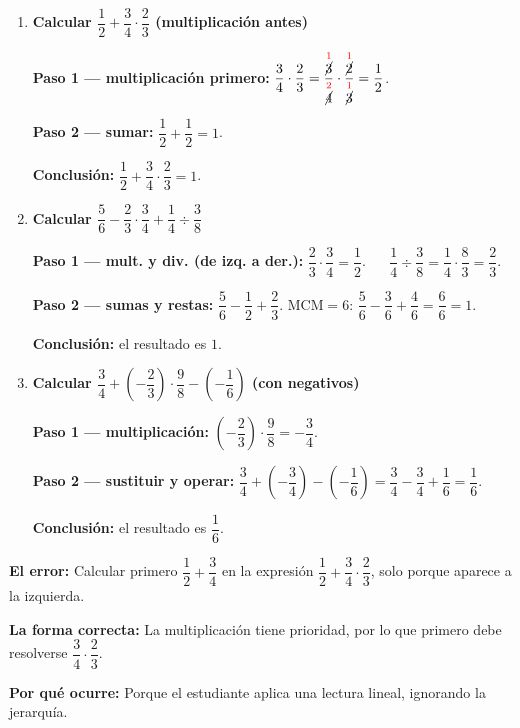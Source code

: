 \documentclass[11pt, letterpaper]{article}
\begin{document}
\begin{tcolorbox}[examplebox, title={Ejemplos sin s\'imbolos de agrupaci\'on}]
\begin{enumerate}[label=\textbf{Ej. \arabic*.}, leftmargin=*, itemsep=16pt]

\item \textbf{Calcular $\dfrac{1}{2}+\dfrac{3}{4}\cdot\dfrac{2}{3}$ (multiplicaci\'on antes)}

\textbf{Paso 1 --- multiplicaci\'on primero:}
$\dfrac{3}{4}\cdot\dfrac{2}{3}=\dfrac{\overset{\textcolor{red}{1}}{\cancel{3}}}{\overset{\textcolor{red}{2}}{\cancel{4}}}\cdot\dfrac{\overset{\textcolor{red}{1}}{\cancel{2}}}{\overset{\textcolor{red}{1}}{\cancel{3}}}=\dfrac{1}{2}$.

\medskip
\textbf{Paso 2 --- sumar:}
$\dfrac{1}{2}+\dfrac{1}{2}=1$.

\medskip
\textbf{Conclusi\'on:} $\dfrac{1}{2}+\dfrac{3}{4}\cdot\dfrac{2}{3}=1$.

\item \textbf{Calcular $\dfrac{5}{6}-\dfrac{2}{3}\cdot\dfrac{3}{4}+\dfrac{1}{4}\div\dfrac{3}{8}$}

\textbf{Paso 1 --- mult. y div. (de izq. a der.):}
$\dfrac{2}{3}\cdot\dfrac{3}{4}=\dfrac{1}{2}$. $\quad$ $\dfrac{1}{4}\div\dfrac{3}{8}=\dfrac{1}{4}\cdot\dfrac{8}{3}=\dfrac{2}{3}$.

\medskip
\textbf{Paso 2 --- sumas y restas:}
$\dfrac{5}{6}-\dfrac{1}{2}+\dfrac{2}{3}$. MCM$=6$: $\dfrac{5}{6}-\dfrac{3}{6}+\dfrac{4}{6}=\dfrac{6}{6}=1$.

\medskip
\textbf{Conclusi\'on:} el resultado es $1$.

\item \textbf{Calcular $\dfrac{3}{4}+\left(-\dfrac{2}{3}\right)\cdot\dfrac{9}{8}-\left(-\dfrac{1}{6}\right)$ (con negativos)}

\textbf{Paso 1 --- multiplicaci\'on:}
$\left(-\dfrac{2}{3}\right)\cdot\dfrac{9}{8}=-\dfrac{3}{4}$.

\medskip
\textbf{Paso 2 --- sustituir y operar:}
$\dfrac{3}{4}+\left(-\dfrac{3}{4}\right)-\left(-\dfrac{1}{6}\right)=\dfrac{3}{4}-\dfrac{3}{4}+\dfrac{1}{6}=\dfrac{1}{6}$.

\medskip
\textbf{Conclusi\'on:} el resultado es $\dfrac{1}{6}$.

\end{enumerate}
\end{tcolorbox}

\begin{tcolorbox}[warningbox, title={Error frecuente --- Resolver siempre de izquierda a derecha}]
\noindent\textbf{El error:}
Calcular primero $\dfrac{1}{2}+\dfrac{3}{4}$ en la expresi\'on $\dfrac{1}{2}+\dfrac{3}{4}\cdot\dfrac{2}{3}$, solo porque aparece a la izquierda.

\medskip
\noindent\textbf{La forma correcta:}
La multiplicaci\'on tiene prioridad, por lo que primero debe resolverse $\dfrac{3}{4}\cdot\dfrac{2}{3}$.

\medskip
\noindent\textbf{Por qu\'e ocurre:}
Porque el estudiante aplica una lectura lineal, ignorando la jerarqu\'ia.
\end{tcolorbox}
\end{document}
